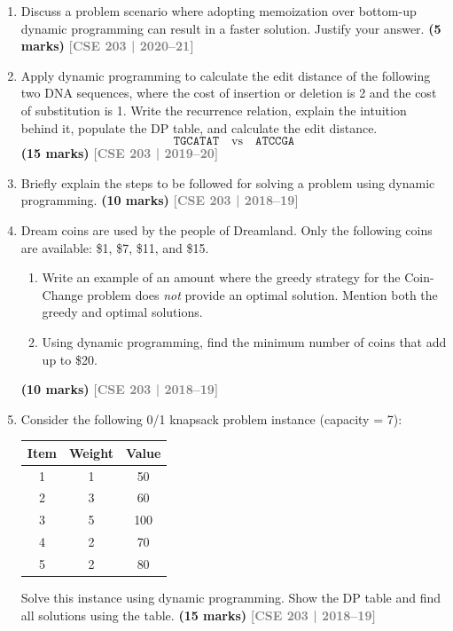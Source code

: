 \documentclass[12pt,a3paper]{article}
\newcommand{\yr}[1]{\hfill\textcolor{gray}{\small\textbf{[#1]}}}
\newcommand{\mk}[1]{\textcolor{orange!70!black}{\small\textbf{(#1 marks)}}}
\begin{document}
\begin{enumerate}
\item Discuss a problem scenario where adopting memoization over bottom-up dynamic programming can result in a faster solution. Justify your answer. \mk{5}
\yr{CSE 203 | 2020--21}

\item Apply dynamic programming to calculate the edit distance of the following two DNA sequences, where the cost of insertion or deletion is 2 and the cost of substitution is 1. Write the recurrence relation, explain the intuition behind it, populate the DP table, and calculate the edit distance.
\[ \texttt{TGCATAT} \quad \text{vs} \quad \texttt{ATCCGA} \]
\mk{15}
\yr{CSE 203 | 2019--20}


\item Briefly explain the steps to be followed for solving a problem using dynamic programming. \mk{10}
\yr{CSE 203 | 2018--19}

\item Dream coins are used by the people of Dreamland. Only the following coins are available: \$1, \$7, \$11, and \$15.
\begin{enumerate}
  \item Write an example of an amount where the greedy strategy for the Coin-Change problem does \emph{not} provide an optimal solution. Mention both the greedy and optimal solutions.
  \item Using dynamic programming, find the minimum number of coins that add up to \$20.
\end{enumerate}
\mk{10}
\yr{CSE 203 | 2018--19}

\item Consider the following 0/1 knapsack problem instance (capacity = 7):
\begin{center}
\begin{tabular}{ccc}
\toprule
Item & Weight & Value \\
\midrule
1 & 1 & 50 \\
2 & 3 & 60 \\
3 & 5 & 100 \\
4 & 2 & 70 \\
5 & 2 & 80 \\
\bottomrule
\end{tabular}
\end{center}
Solve this instance using dynamic programming. Show the DP table and find all solutions using the table. \mk{15}
\yr{CSE 203 | 2018--19}


\end{enumerate}
\end{document}

